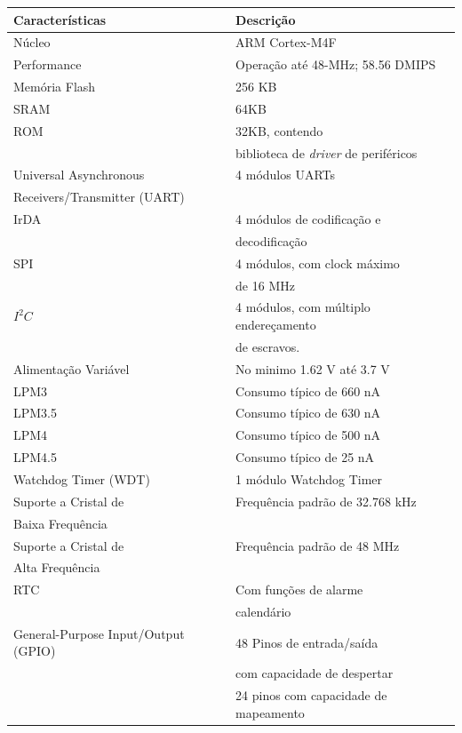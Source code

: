 \begin{longtable}{|l|l|}
	\hline
	\cellcolor[HTML]{343434} \color[HTML]{FFFFFF} Características & \cellcolor[HTML]{343434} \color[HTML]{FFFFFF} Descrição \\
	\hline
	Núcleo 			& ARM Cortex-M4F\\
	\hline
	Performance 	& Operação até 48-MHz; 58.56 DMIPS  \\
	\hline
	Memória Flash 	& 256 KB  \\
	\hline
	SRAM 			& 64KB \\
	\hline
	ROM 			&  32KB,  contendo\\
					& biblioteca de \emph{driver} de periféricos\\
	Universal Asynchronous  & 4 módulos UARTs \\
	Receivers/Transmitter (UART) & \\
	\hline
	IrDA 			& 4 módulos de codificação e\\
					& decodificação \\
	\hline
	SPI 			& 4 módulos, com clock máximo\\
					& de 16 MHz\\
	\hline
	$I^2C$ 			& 4 módulos, com múltiplo endereçamento \\
					& de escravos.\\
	\hline
	Alimentação Variável &  No minimo 1.62 V até 3.7 V\\ 
	\hline
	LPM3                 & Consumo típico de 660 nA \\
	\hline
	LPM3.5               & Consumo típico de 630 nA \\
	\hline
	LPM4                 & Consumo típico de 500 nA \\
	\hline
	LPM4.5               & Consumo típico de 25 nA \\
	\hline
	Watchdog Timer (WDT) & 1 módulo Watchdog Timer \\
	\hline
	Suporte a Cristal de & Frequência padrão de 32.768 kHz \\
	Baixa Frequência     &                         \\
	\hline
	Suporte a Cristal de & Frequência padrão de 48 MHz \\
	Alta Frequência      &                         \\
	\hline
	RTC                  & Com funções de alarme  \\
	                     & calendário             \\
	\hline
	General-Purpose Input/Output (GPIO) & 48 Pinos de entrada/saída\\
	                                    & com capacidade de despertar \\
	                                    & 24 pinos com capacidade de mapeamento\\
		

\end{longtable}
